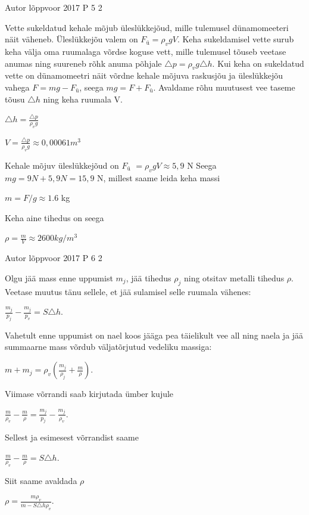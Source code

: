 \documentclass[11pt]{article}
\begin{document}
{%
{Autor} %
{lõppvoor} %
{2017} %
{P 5} %
{2} %
{

\ifSolution
Vette sukeldatud kehale mõjub üleslükkejõud, mille tulemusel dünamomeeteri näit väheneb. Üleslükkejõu valem on ${F_ü} = \rho_v g V$. 
\newline
Keha sukeldamisel vette surub keha välja oma ruumalaga võrdse koguse vett, mille tulemusel tõuseb veetase anumas ning suureneb rõhk anuma põhjale $\triangle p = \rho_v g \triangle h$.
\newline
Kui keha on sukeldatud vette on dünamomeetri näit võrdne kehale mõjuva raskusjõu ja üleslükkejõu vahega $F = mg - {F_ü}$, seega $mg = F + {F_ü}$.
\newline
Avaldame rõhu muutusest vee taseme tõusu $\triangle h$ ning keha ruumala V.
\begin{center}
$\triangle h = \frac{\triangle p}{\rho_v g}$ 
\end{center}
\begin{center}
$V = \frac{\triangle p}{\rho_v g} \approx 0,00061 m^3$
\end{center}
Kehale mõjuv üleslükkejõud on ${F_ü}$ $= \rho_v g V \approx 5,9$ N
\newline
Seega $m g = 9 N + 5,9 N = 15,9$ N, millest saame leida keha massi
\begin{center}
$m = F/g \approx 1.6$ kg
\end{center}
Keha aine tihedus on seega
\begin{center}
$\rho = \frac{m}{V} \approx 2600 kg/m^3$
\end{center}
\fi
}


{Autor} %
{lõppvoor} %
{2017} %
{P 6} %
{2} %
{

\ifSolution
Olgu jää mass enne uppumist $m_j$, jää tihedus $\rho_j$ ning otsitav metalli tihedus $\rho$.
Veetase muutus tänu sellele, et jää sulamisel selle ruumala vähenes:
\begin{center}
$\frac{m_j}{p_j} - \frac{m_j}{p_v} = S\triangle h$.
\end{center}
Vahetult enne uppumist on nael koos jääga pea täielikult vee all ning naela ja jää summaarne mass võrdub väljatõrjutud vedeliku massiga:
\begin{center}
$m + m_j = \rho_v (\frac{m_j}{\rho_j} + \frac{m}{\rho})$.
\end{center}
Viimase võrrandi saab kirjutada ümber kujule
\begin{center}
$\frac{m}{\rho_v} - \frac{m}{\rho} = \frac{m_j}{p_j} - \frac{m_j}{\rho_v}$.
\end{center}
Sellest ja esimesest võrrandist saame
\begin{center}
$\frac{m}{\rho_v} - \frac{m}{\rho} = S \triangle h$.
\end{center}
Siit saame avaldada $\rho$
\begin{center}
$\rho = \frac{m \rho_v}{m - S \triangle h \rho_v}$.
\end{center}
\fi
}

}
\end{document}
